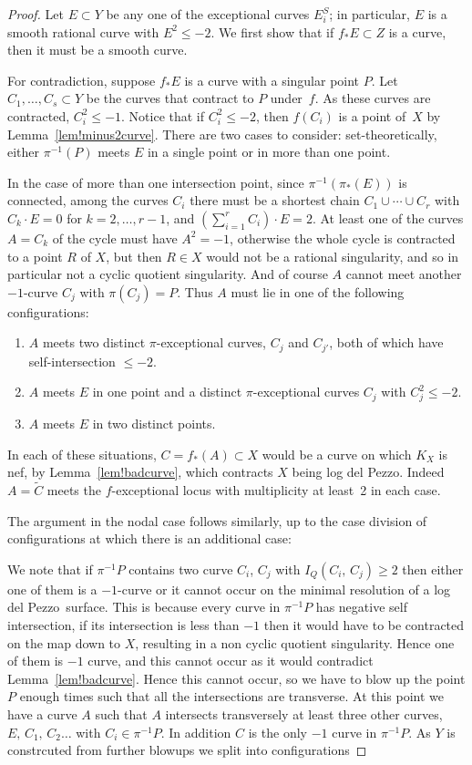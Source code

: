 \documentclass[11pt]{amsbook}
\theoremstyle{definition}
\theoremstyle{definition}
\theoremstyle{definition}
\theoremstyle{definition}
\theoremstyle{definition}
\theoremstyle{definition}
\theoremstyle{definition}
\theoremstyle{definition}
\newcommand{\ldp}{log del Pezzo}
\newcommand{\wt}[1]{\widetilde #1}
\begin{document}
\begin{proof}
Let $E\subset Y$ be any one of the exceptional curves $E_i^S$; in particular, $E$ is
a smooth rational curve with $E^2 \le-2$.
We first show that if $f_* E\subset Z$ is a curve, then it must be a smooth curve. 

For contradiction, suppose $f_*E$ is a curve with a singular point $P$.
Let $C_1,\dots,C_s\subset Y$ be the curves that contract to $P$ under~$f$.
As these curves are contracted, $C_i^2 \leq  -1$.
Notice that if $C_i^2\le-2$, then $f(C_i)$ is a point of~$X$
by Lemma~\ref{lem!minus2curve}.
There are two cases to consider: set-theoretically, either
$\pi^{-1}(P)$ meets $E$ in a single point or in more than one point.


In the case of more than one intersection point, since $\pi^{-1}(\pi_*(E))$ is connected,
among the curves $C_i$ there must be a shortest chain $C_1\cup\cdots\cup C_r$
with $C_k\cdot E=0$ for $k=2,\dots,r-1$, and $\left(\sum_{i=1}^r C_i\right)\cdot E = 2$.
At least one of the curves $A=C_k$ of the cycle must have $A^2=-1$, otherwise the
whole cycle is contracted to a point $R$ of $X$, but then $R\in X$ would not be
a rational singularity, and so in particular not a cyclic quotient singularity.
And of course $A$ cannot meet another $-1$-curve $C_j$ with $\pi(C_j)=P$.
Thus $A$ must lie in one of the following configurations:
\begin{enumerate}
\item
$A$ meets two distinct $\pi$-exceptional curves, $C_j$ and $C_{j'}$,
both of which have self-intersection $\le-2$.
\item
$A$ meets $E$ in one point and a distinct $\pi$-exceptional curves $C_j$
with $C_j^2\le-2$.
\item
$A$ meets $E$ in two distinct points.
\end{enumerate}
In each of these situations, $C = f_*(A)\subset X$ would be a curve
on which $K_X$ is nef, by Lemma~\ref{lem!badcurve}, which contracts
$X$ being \ldp. Indeed $A = \wt C$ meets the $f$-exceptional locus with multiplicity
at least~2 in each case.

The argument in the nodal case follows similarly, up to the case division of configurations
at which there is an additional case:

We note that if $\pi^{-1}{P}$ contains two curve $C_i$, $C_j$ with $I_Q (C_i, \, C_j) \ge 2$ then either one of them is a $-1$-curve or it cannot occur on the minimal resolution of a \ldp\ surface. This is because every curve in $\pi^{-1}{P}$ has negative self intersection, if its intersection is less than $-1$ then it would have to be contracted on the map down to $X$, resulting in a non cyclic quotient singularity. Hence one of them is $-1$ curve, and this cannot occur as it would contradict Lemma~\ref{lem!badcurve}. Hence this cannot occur, so we have to blow up the point $P$ enough times such that all the intersections are transverse. At this point we have a curve $A$ such that $A$ intersects transversely at least three other curves, $E, \, C_1, \, C_2 \dots $ with $C_i \in \pi^{-1} {P}$. In addition $C$ is the only $-1$ curve in $\pi^{-1}{P}$. As $Y$ is constrcuted from further blowups we split into configurations 


\end{proof}
\end{document}
